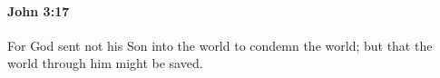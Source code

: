 			\begin{framed}
			\scriptsize
				\begin{compactdesc}
					\item[SBLG]  \hyperref[KOSMOS]{} 
				\end{compactdesc}
			\end{framed}

		\paragraph{John 3:17} %
			\label{JOHN-3-17}

			For God sent not his Son into the world to condemn the world; but that the world through him might be saved.

			\begin{framed}
			\scriptsize
				\begin{compactdesc}
					\item[SBLG]  \hyperref[KOSMOS]{}  \hyperref[KRINO]{}  \hyperref[KOSMOS]{} \hyperref[KOSMOS]{} \gr{δι᾽ αὐτοῦ.}
				\end{compactdesc}
			\end{framed}

